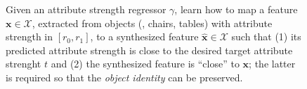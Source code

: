 \documentclass[10pt,twocolumn,letterpaper]{article}
\begin{document}
\begin{figure}[t!]
\caption{\label{fig:intro}Given an attribute
strength regressor $\gamma$, learn how to map a feature
$\mathbf{x} \in \mathcal{X}$, extracted from objects (\eg, chairs, tables)
with attribute strength in $[r_0,r_1]$, to a synthesized feature
$\mathbf{\hat{x} \in \mathcal{X}}$ such that (1) its predicted attribute
strength is close to the desired target attribute strenght 
$t$ and (2) the synthesized feature is ``close'' to $\mathbf{x}$; the latter
is required so that the \emph{object identity} can be
preserved.}
\end{figure}
\end{document}
